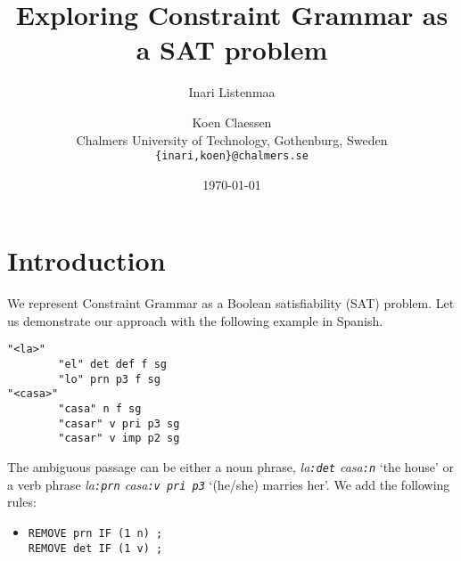 \documentclass[11pt]{article}
\title{Exploring Constraint Grammar as a SAT problem}
\author{Inari Listenmaa \and Koen Claessen \\
  Chalmers University of Technology, Gothenburg, Sweden \\
  {\tt \{inari,koen\}@chalmers.se} }
\date{\today}
\begin{document}
\maketitle



\section{Introduction}

We represent Constraint Grammar \cite{karlsson1995constraint} 
as a Boolean satisfiability (SAT) problem.
Let us demonstrate our approach with the following example in Spanish.

\begin{verbatim}
"<la>"
        "el" det def f sg
        "lo" prn p3 f sg
"<casa>"
        "casa" n f sg
        "casar" v pri p3 sg
        "casar" v imp p2 sg
\end{verbatim}

The ambiguous passage can be either a noun phrase, \emph{la\texttt{:det} casa\texttt{:n}} 
`the house'  or a verb phrase \emph{la\texttt{:prn} casa\texttt{:v pri p3}} `(he/she) marries her'. 
We add the following rules:

\begin{itemize}
\item [] \texttt{REMOVE prn IF (1 n) ;} \\
             \texttt{REMOVE det IF (1 v) ;}
\end{itemize}
\end{document}
